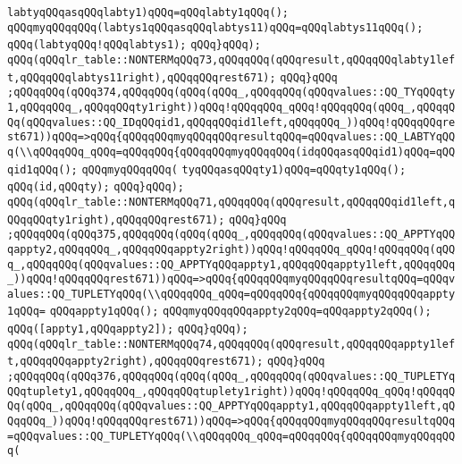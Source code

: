 \verb|labtyqQQqasqQQqlabty1)qQQq=qQQqlabty1qQQq();|\newline
\verb|qQQqmyqQQqqQQq(labtys1qQQqasqQQqlabtys11)qQQq=qQQqlabtys11qQQq();|\newline
\verb|qQQq(labtyqQQq!qQQqlabtys1);|\newline
\verb|qQQq}qQQq);|\newline
\verb|qQQq(qQQqlr_table::NONTERMqQQq73,qQQqqQQq(qQQqresult,qQQqqQQqlabty1left,qQQqqQQqlabtys11right),qQQqqQQqrest671);|\newline
\verb|qQQq}qQQq|\newline
\verb|;qQQqqQQq(qQQq374,qQQqqQQq(qQQq(qQQq_,qQQqqQQq(qQQqvalues::QQ_TYqQQqty1,qQQqqQQq_,qQQqqQQqty1right))qQQq!qQQqqQQq_qQQq!qQQqqQQq(qQQq_,qQQqqQQq(qQQqvalues::QQ_IDqQQqid1,qQQqqQQqid1left,qQQqqQQq_))qQQq!qQQqqQQqrest671))qQQq=>qQQq{qQQqqQQqmyqQQqqQQqresultqQQq=qQQqvalues::QQ_LABTYqQQq(\\qQQqqQQq_qQQq=qQQqqQQq{qQQqqQQqmyqQQqqQQq(idqQQqasqQQqid1)qQQq=qQQqid1qQQq();|\newline
\verb|qQQqmyqQQqqQQq(|\newline
\verb|tyqQQqasqQQqty1)qQQq=qQQqty1qQQq();|\newline
\verb|qQQq(id,qQQqty);|\newline
\verb|qQQq}qQQq);|\newline
\verb|qQQq(qQQqlr_table::NONTERMqQQq71,qQQqqQQq(qQQqresult,qQQqqQQqid1left,qQQqqQQqty1right),qQQqqQQqrest671);|\newline
\verb|qQQq}qQQq|\newline
\verb|;qQQqqQQq(qQQq375,qQQqqQQq(qQQq(qQQq_,qQQqqQQq(qQQqvalues::QQ_APPTYqQQqappty2,qQQqqQQq_,qQQqqQQqappty2right))qQQq!qQQqqQQq_qQQq!qQQqqQQq(qQQq_,qQQqqQQq(qQQqvalues::QQ_APPTYqQQqappty1,qQQqqQQqappty1left,qQQqqQQq_))qQQq!qQQqqQQqrest671))qQQq=>qQQq{qQQqqQQqmyqQQqqQQqresultqQQq=qQQqvalues::QQ_TUPLETYqQQq(\\qQQqqQQq_qQQq=qQQqqQQq{qQQqqQQqmyqQQqqQQqappty1qQQq=|\newline
\verb|qQQqappty1qQQq();|\newline
\verb|qQQqmyqQQqqQQqappty2qQQq=qQQqappty2qQQq();|\newline
\verb|qQQq([appty1,qQQqappty2]);|\newline
\verb|qQQq}qQQq);|\newline
\verb|qQQq(qQQqlr_table::NONTERMqQQq74,qQQqqQQq(qQQqresult,qQQqqQQqappty1left,qQQqqQQqappty2right),qQQqqQQqrest671);|\newline
\verb|qQQq}qQQq|\newline
\verb|;qQQqqQQq(qQQq376,qQQqqQQq(qQQq(qQQq_,qQQqqQQq(qQQqvalues::QQ_TUPLETYqQQqtuplety1,qQQqqQQq_,qQQqqQQqtuplety1right))qQQq!qQQqqQQq_qQQq!qQQqqQQq(qQQq_,qQQqqQQq(qQQqvalues::QQ_APPTYqQQqappty1,qQQqqQQqappty1left,qQQqqQQq_))qQQq!qQQqqQQqrest671))qQQq=>qQQq{qQQqqQQqmyqQQqqQQqresultqQQq=qQQqvalues::QQ_TUPLETYqQQq(\\qQQqqQQq_qQQq=qQQqqQQq{qQQqqQQqmyqQQqqQQq(|\newline
